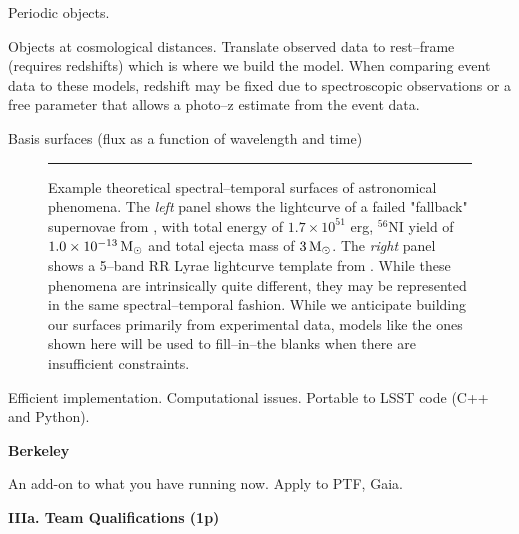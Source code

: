 

Periodic objects.

Objects at cosmological distances.  Translate observed data to rest--frame
(requires redshifts) which is where we build the model.  When comparing event
data to these models, redshift may be fixed due to spectroscopic observations or
a free parameter that allows a photo--z estimate from the event data.

Basis surfaces (flux as a function of wavelength and time)

\begin{figure}[t]
\centerline{ \hfil
{}} \smallskip
\caption[]{\footnotesize Example theoretical spectral--temporal surfaces of
astronomical phenomena.  The {\it left} panel shows the lightcurve of a failed
"fallback" supernovae from \cite{2009ApJ...707..193F}, with total energy of $1.7
\times 10^{51}$ erg, $^{56}$NI yield of $1.0 \times 10^{-13} {\rm\,M_\odot}$ and total
ejecta mass of $3 {\rm\,M_\odot}$.  The {\it right} panel shows a 5--band RR Lyrae
lightcurve template from \cite{2010ApJ...708..717S}.  While these phenomena are
intrinsically quite different, they may be represented in the same
spectral--temporal fashion.  While we anticipate building our surfaces primarily
from experimental data, models like the ones shown here will be used to
fill--in--the blanks when there are insufficient constraints.} \medskip \hrule
\label{fig:sts} \end{figure}


 

Efficient implementation.  Computational issues.  Portable to LSST code (C++ and
Python).

 \smallskip
{\bf Berkeley}

An add-on to what you have running now.  Apply to PTF, Gaia.



\bigskip \centerline{\bf IIIa. Team Qualifications (1p)} \smallskip

 \smallskip

